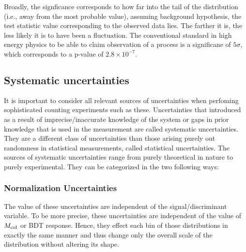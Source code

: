Broadly, the signficance corresponds to how far into the tail of the distribution (i.e., away from the most probable value), assuming background hypothesis, the test statistic value corresponding to the observed data lies. The farther it is, the less likely it is to have been a fluctuation. The conventional standard in high energy physics to be able to claim observation of a process is a significane of $5\sigma$, which corresponds to a p-value of $2.8\times 10^{-7}$.


\subsection{Systematic uncertainties}
\label{exp_uncert}
It is important to consider all relevant sources of uncertainties when perfoming sophisticated counting experiments such as these. Uncertainties that introduced as a result of imprecise/inaccurate knowledge of the system or gaps in prior knowledge that is used in the measurement are called systematic uncertainties. They are a different class of uncertainties than those arising purely out randomness in statistical measurements, called statistical uncertainties. The sources of systematic uncertainties range from purely theoretical in nature to purely experimental. They can be categorized in the two following ways:
\subsubsection{Normalization Uncertainties}
The value of these uncertainties are independent of the signal/discriminant variable. To be more precise, these uncertainties are independent of the value of $M_{\text{col}}$ or BDT response. Hence, they effect each bin of those distributions in exactly the same manner and thus change only the overall scale of the distribution without altering its shape.

